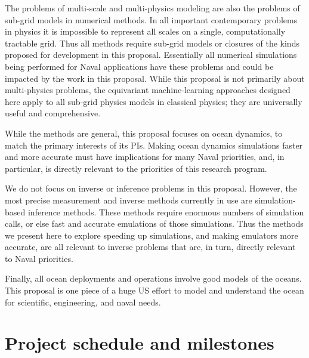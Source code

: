 \documentclass[11pt]{article}
\begin{document}
The problems of multi-scale and multi-physics modeling are also the problems of sub-grid models in numerical methods.
In all important contemporary problems in physics it is impossible to represent all scales on a single, computationally tractable grid.
Thus all methods require sub-grid models or closures of the kinds proposed for development in this proposal.
Essentially all numerical simulations being performed for Naval applications have these problems and could be impacted by the work in this proposal.
While this proposal is not primarily about multi-physics problems, the equivariant machine-learning approaches designed here apply to all sub-grid physics models in classical physics; they are universally useful and comprehensive.

While the methods are general, this proposal focuses on ocean dynamics, to match the primary interests of its PIs.
Making ocean dynamics simulations faster and more accurate must have implications for many Naval priorities,
and, in particular, is directly relevant to the priorities of this research program.

We do not focus on inverse or inference problems in this proposal.
However, the most precise measurement and inverse methods currently in use are simulation-based inference methods.
These methods require enormous numbers of simulation calls, or else fast and accurate emulations of those simulations.
Thus the methods we present here to explore speeding up simulations, and making emulators more accurate, are all relevant to inverse problems that are, in turn, directly relevant to Naval priorities.

Finally, all ocean deployments and operations involve good models of the oceans.
This proposal is one piece of a huge US effort to model and understand the ocean for scientific, engineering, and naval needs.

\section{Project schedule and milestones}\label{sec:deliverables}
\end{document}
